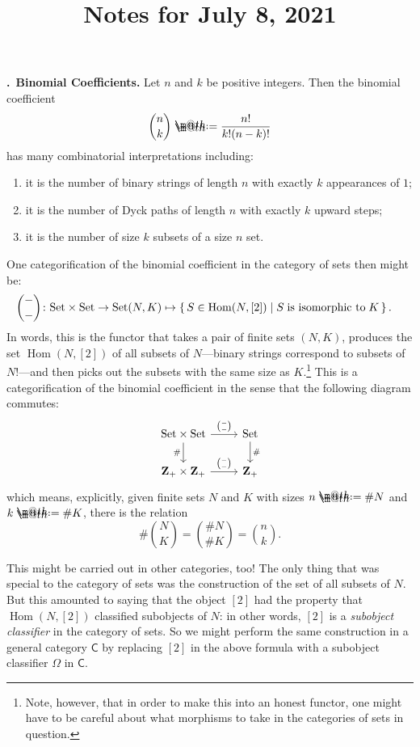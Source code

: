 \documentclass[11pt,noamsfonts]{amsart}
\title{Notes for July 8, 2021}
\makeatletter
\newcommand{\pointheader}{\vspace{2mm}\noindent\refstepcounter{section}\textbf{\thesection.}}
\newcommand{\bpoint}[1]{\pointheader~{\bf #1.}}
\newcommand*{\coloneqq}{\mathrel{\rlap{%
           \raisebox{0.3ex}{$\m@th\cdot$}}%
           \raisebox{-0.3ex}{$\m@th\cdot$}}%
           =}
\DeclareMathOperator{\Hom}{Hom}
\makeatother
\begin{document}
\maketitle

\bpoint{Binomial Coefficients}
Let \(n\) and \(k\) be positive integers. Then the binomial coefficient
\[
\binom{n}{k} \coloneqq \frac{n!}{k!(n-k)!}
\]
has many combinatorial interpretations including:
\begin{enumerate}
\item it is the number of binary strings of length \(n\) with exactly
\(k\) appearances of \(1\);
\item it is the number of Dyck paths of length \(n\) with exactly \(k\)
upward steps;
\item it is the number of size \(k\) subsets of a size \(n\) set.
\end{enumerate}
One categorification of the binomial coefficient in the category of sets then
might be:
\begin{align*}
\binom{-}{-} \colon \mathrm{Set} \times \mathrm{Set} \to \mathrm{Set}
(N,K) & \mapsto \set{S \in \Hom(N,[2]) | S\;\text{is isomorphic to}\;K}.
\end{align*}
In words, this is the functor that takes a pair of finite sets \((N,K)\),
produces the set \(\Hom(N,[2])\) of all subsets of \(N\)---binary strings
correspond to subsets of \(N\)!---and then picks out the subsets with the same
size as \(K\).\footnote{Note, however, that in order to make this into an
honest functor, one might have to be careful about what morphisms to take in
the categories of sets in question.} This is a categorification of the binomial
coefficient in the sense that the following diagram commutes:
\[
\begin{tikzcd}
\mathrm{Set} \times \mathrm{Set} \ar[r,"\binom{-}{-}"] \ar[d,"\#"'] & \mathrm{Set} \ar[d,"\#"] \\
\mathbf{Z}_+ \times \mathbf{Z}_+ \ar[r,"\binom{-}{-}"] & \mathbf{Z}_+
\end{tikzcd}
\]
which means, explicitly, given finite sets \(N\) and \(K\) with sizes \(n \coloneqq \#N\)
and \(k \coloneqq \#K\), there is the relation
\[ \#\binom{N}{K} = \binom{\#N}{\#K} = \binom{n}{k}. \]

This might be carried out in other categories, too! The only thing that was
special to the category of sets was the construction of the set of all subsets
of \(N\). But this amounted to saying that the object \([2]\) had the property
that \(\Hom(N,[2])\) classified subobjects of \(N\): in other words, \([2]\)
is a \emph{subobject classifier} in the category of sets. So we might
perform the same construction in a general category \(\mathsf{C}\) by replacing
\([2]\) in the above formula with a subobject classifier \(\Omega\) in \(\mathsf{C}\).
\end{document}
